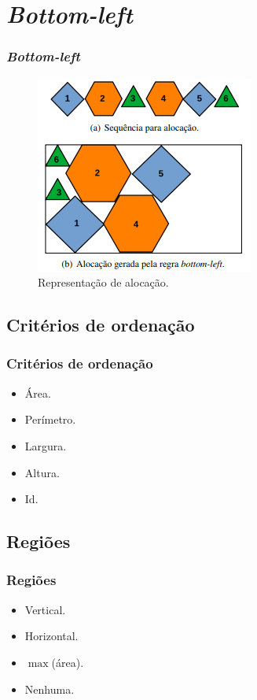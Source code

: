 \section{\textit{Bottom-left}}\label{sec:bottom-left}
\begin{frame}
    \frametitle{\textit{Bottom-left}}
    \begin{figure}[!htb]
        \centering
        \includegraphics[scale=0.8]{utils/images/bottom-left}
        \caption{Representação de alocação.}
        \label{fig:bottom-left}
    \end{figure}
\end{frame}

\subsection{Critérios de ordenação}\label{subsec:criterios-de-ordenacao}
\begin{frame}
    \frametitle{Critérios de ordenação}
    \begin{itemize}
        \item Área.
        \item Perímetro.
        \item Largura.
        \item Altura.
        \item Id.
    \end{itemize}
\end{frame}

\subsection{Regiões}\label{subsec:regioes}
\begin{frame}
    \frametitle{Regiões}
    \begin{itemize}
        \item Vertical.
        \item Horizontal.
        \item $\max$(área).
        \item Nenhuma.
    \end{itemize}
\end{frame}

